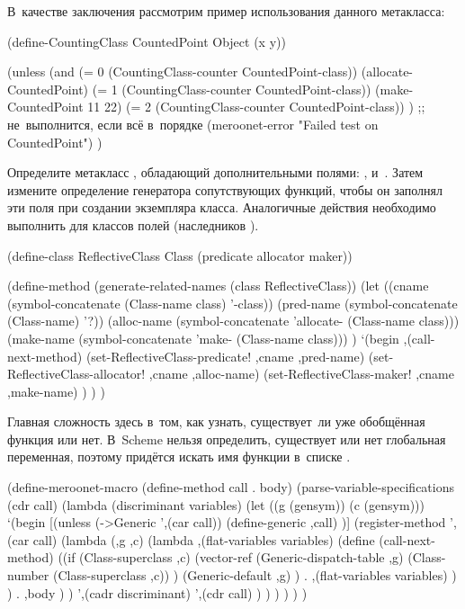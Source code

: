 В~качестве заключения рассмотрим пример использования данного метакласса:

\begin{code:lisp}
(define-CountingClass CountedPoint Object (x y))

(unless (and (= 0 (CountingClass-counter CountedPoint-class))
             (allocate-CountedPoint)
             (= 1 (CountingClass-counter CountedPoint-class))
             (make-CountedPoint 11 22)
             (= 2 (CountingClass-counter CountedPoint-class)) )
  ;; не~выполнится, если всё в~порядке
  (meroonet-error "Failed test on CountedPoint") )
\end{code:lisp}



Определите метакласс , обладающий дополнительными полями:
,  и~. Затем измените определение
генератора сопутствующих функций, чтобы он заполнял эти поля при создании
экземпляра класса. Аналогичные действия необходимо выполнить для классов полей
(наследников ).

\begin{code:lisp}
(define-class ReflectiveClass Class (predicate allocator maker))

(define-method (generate-related-names (class ReflectiveClass))
  (let ((cname      (symbol-concatenate (Class-name class) '-class))
        (pred-name  (symbol-concatenate (Class-name) '?))
        (alloc-name (symbol-concatenate 'allocate- (Class-name class)))
        (make-name  (symbol-concatenate 'make- (Class-name class))) )
    `(begin ,(call-next-method)
            (set-ReflectiveClass-predicate! ,cname ,pred-name)
            (set-ReflectiveClass-allocator! ,cname ,alloc-name)
            (set-ReflectiveClass-maker!     ,cname ,make-name) ) ) )
\end{code:lisp}



Главная сложность здесь в~том, как узнать, существует~ли уже обобщённая
функция или нет. В~Scheme нельзя определить, существует или нет глобальная
переменная, поэтому придётся искать имя функции в~списке .

\begin{code:lisp}
(define-meroonet-macro (define-method call . body)
  (parse-variable-specifications
   (cdr call)
   (lambda (discriminant variables)
     (let ((g (gensym)) (c (gensym)))
       `(begin
          [(unless (->Generic ',(car call))
            (define-generic ,call) )]
          (register-method
           ',(car call)
           (lambda (,g ,c)
             (lambda ,(flat-variables variables)
               (define (call-next-method)
                 ((if (Class-superclass ,c)
                      (vector-ref (Generic-dispatch-table ,g)
                                  (Class-number (Class-superclass ,c)) )
                      (Generic-default ,g) )
                  . ,(flat-variables variables) ) )
               . ,body ) )
           ',(cadr discriminant)
           ',(cdr call) ) ) ) ) ) )
\end{code:lisp}



